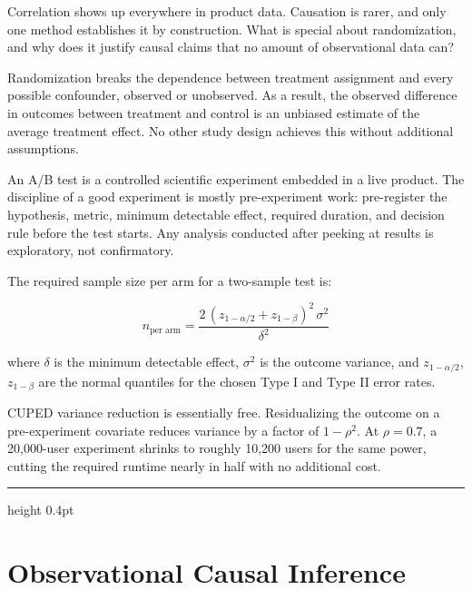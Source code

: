 \documentclass[12pt,a4paper]{article}
\begin{document}
Correlation shows up everywhere in product data. Causation is rarer, and
only one method establishes it by construction. What is special about
randomization, and why does it justify causal claims that no amount of
observational data can?

\begin{concept}
Randomization breaks the dependence between treatment assignment and every
possible confounder, observed or unobserved. As a result, the observed
difference in outcomes between treatment and control is an unbiased
estimate of the average treatment effect. No other study design achieves
this without additional assumptions.
\end{concept}

\begin{analogy}
An A/B test is a controlled scientific experiment embedded in a live
product. The discipline of a good experiment is mostly pre-experiment
work: pre-register the hypothesis, metric, minimum detectable effect,
required duration, and decision rule before the test starts. Any
analysis conducted after peeking at results is exploratory, not
confirmatory.
\end{analogy}

The required sample size per arm for a two-sample test is:

\begin{equation*}
  n_{\text{per arm}}
  = \frac{2\,(z_{1-\alpha/2} + z_{1-\beta})^2\,\sigma^2}{\delta^2}
\end{equation*}

where $\delta$ is the minimum detectable effect, $\sigma^2$ is the
outcome variance, and $z_{1-\alpha/2}$, $z_{1-\beta}$ are the normal
quantiles for the chosen Type I and Type II error rates.

\begin{mentalmodel}
CUPED variance reduction is essentially free. Residualizing the outcome
on a pre-experiment covariate reduces variance by a factor of
$1 - \rho^2$. At $\rho = 0.7$, a 20{,}000-user experiment shrinks to
roughly 10{,}200 users for the same power, cutting the required runtime
nearly in half with no additional cost.
\end{mentalmodel}

\vspace{10pt}\hrule height 0.4pt\vspace{14pt}

\section*{Observational Causal Inference}
\end{document}
